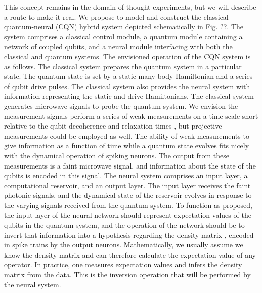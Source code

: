 This concept remains in the domain of thought experiments, but we will describe a route to make it real. We propose to model and construct the classical-quantum-neural (CQN) hybrid system depicted schematically in Fig. ??. The system comprises a classical control module, a quantum module containing a network of coupled qubits, and a neural module interfacing with both the classical and quantum systems. The envisioned operation of the CQN system is as follows. The classical system prepares the quantum system in a particular state. The quantum state is set by a static many-body Hamiltonian and a series of qubit drive pulses. The classical system also provides the neural system with information representing the static and drive Hamiltonians. The classical system generates microwave signals to probe the quantum system. We envision the measurement signals perform a series of weak measurements on a time scale short relative to the qubit decoherence and relaxation times \cite{muwe2013}, but projective measurements could be employed as well. The ability of weak measurements to give information as a function of time while a quantum state evolves fits nicely with the dynamical operation of spiking neurons. The output from these measurements is a faint microwave signal, and information about the state of the qubits is encoded in this signal. The neural system comprises an input layer, a computational reservoir, and an output layer. The input layer receives the faint photonic signals, and the dynamical state of the reservoir evolves in response to the varying signals received from the quantum system. To function as proposed, the input layer of the neural network should represent expectation values of the qubits in the quantum system, and the operation of the network should be to invert that information into a hypothesis regarding the density matrix \cite{jo1994,bl2010}, encoded in spike trains by the output neurons. Mathematically, we usually assume we know the density matrix and can therefore calculate the expectation value of any operator. In practice, one measures expectation values and infers the density matrix from the data. This is the inversion operation that will be performed by the neural system.

